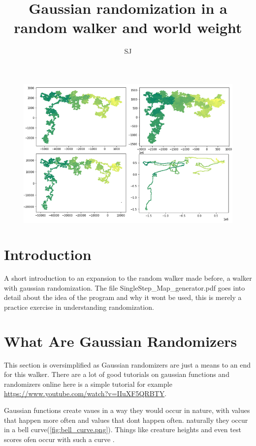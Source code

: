 \documentclass[8pt,letterpaper]{article}
\author{SJ}
\begin{document}
\title{Gaussian randomization in a random walker and world weight}
\maketitle
\begin{figure}[h]
\centering
\includegraphics[scale = 0.7]{Images/frontpage.png}
\end{figure}

\newpage{}
\tableofcontents
\section{Introduction}
A short introduction to an expansion to the random walker made before, a walker with gaussian randomization. The file SingleStep\_Map\_generator.pdf goes into detail about the idea of the program and why it wont be used, this is merely a practice exercise in understanding randomization.

\section{What Are Gaussian Randomizers}
This section is oversimplified as Gaussian randomizers are just a means to an end for this walker. There are a lot of good tutorials on gaussian functions and randomizers online here is a simple tutorial for example \url{https://www.youtube.com/watch?v=IIuXF5QRBTY}. 

Gaussian functions create vaues in a way they would occur in nature, with values that happen more often and values that dont happen often. naturally they occur in a bell curve(\ref{fig:bell_curve.png}). Things like creature heights and even test scores ofen occur with such a curve .
\end{document}
